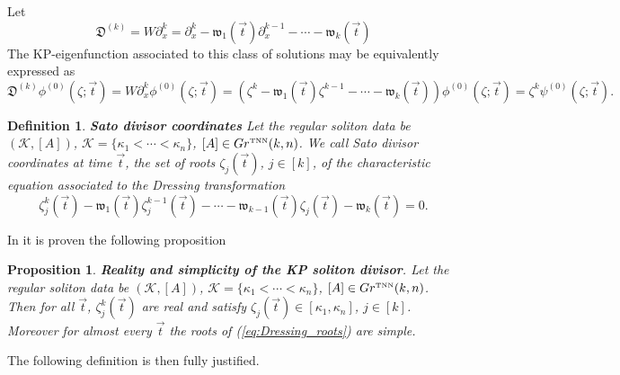 \documentclass[11pt]{amsart}
\theoremstyle{plain}
\numberwithin{equation}{section}
\newtheorem{proposition}[theorem]{Proposition}
\newtheorem{definition}{Definition}[subsection]
\def \GTNN {{Gr^{\mbox{\tiny TNN}} (k,n)}}
\begin{document}
Let
\begin{equation}\label{eq:D}
{\mathfrak D}^{(k)} = W\partial_x^k = \partial_x^k - {\mathfrak w}_1 (\vec t)\partial_x^{k-1} -\cdots - {\mathfrak w}_k(\vec t)
\end{equation}
The KP-eigenfunction associated to this class of solutions may be equivalently expressed as
\begin{equation}\label{eq:Satowf} 
{\mathfrak D}^{(k)}\phi^{(0)} (\zeta; \vec t)  = W\partial_x^k \phi^{(0)} (\zeta; \vec t)
= \left(\zeta^k -{\mathfrak w}_1 (\vec t)\zeta^{k-1} -\cdots - {\mathfrak w}_k(\vec t)\right)
\phi^{(0)} (\zeta; \vec t) = \zeta^k \psi^{(0)} (\zeta; \vec t).
\end{equation}

\begin{definition}\label{def:Satodiv}{\bf Sato divisor coordinates}
Let the regular soliton data be $({\mathcal K}, [A])$, ${\mathcal K} = \{ \kappa_1 < \cdots < \kappa_n \}$, $[A]\in \GTNN$. We call Sato divisor coordinates at time $\vec t$, the set of roots $\zeta_j (\vec t)$, $j\in [k]$, of the characteristic equation associated to the Dressing transformation
\begin{equation}\label{eq:Dressing_roots}
\zeta_j^k(\vec t) - {\mathfrak w}_1 (\vec t)\zeta_j^{k-1}(\vec t)-\cdots  - {\mathfrak w}_{k-1} (\vec t)\zeta_j(\vec t)- {\mathfrak w}_k(\vec t) = 0. 
\end{equation}
\end{definition}

In \cite{Mal} it is proven the following proposition
\begin{proposition}\textbf{Reality and simplicity of the KP soliton divisor}\label{prop:malanyuk} \cite{Mal}.
Let the regular soliton data be $({\mathcal K}, [A])$, ${\mathcal K} = \{ \kappa_1 < \cdots < \kappa_n \}$, $[A]\in \GTNN$. Then for all $\vec t$, $\zeta_j^k(\vec t)$ are real and satisfy $\zeta_j(\vec t)\in [\kappa_1,\kappa_n]$, $j\in [k]$. 
Moreover for almost every $\vec t$ the roots of (\ref{eq:Dressing_roots}) are simple.
\end{proposition}

The following definition is then fully justified.
\end{document}

